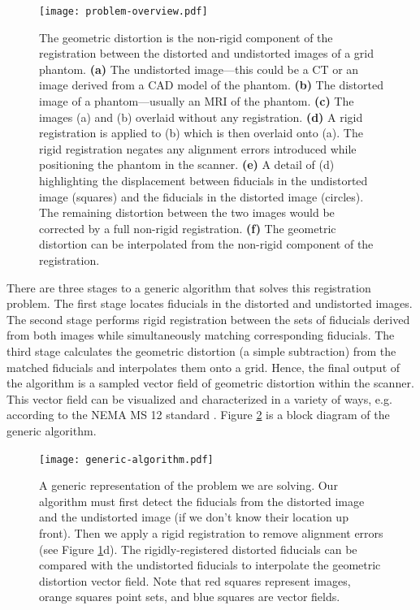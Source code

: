 \documentclass[12pt]{article}
\begin{document}
\begin{figure}
    \centering
    \texttt{[image: problem-overview.pdf]}
    \caption{The geometric distortion is the non-rigid component of the registration between the distorted and undistorted images of a grid phantom. \textbf{(a)} The undistorted image---this could be a CT or an image derived from a CAD model of the phantom.  \textbf{(b)} The distorted image of a phantom---usually an MRI of the phantom.  \textbf{(c)} The images (a) and (b) overlaid without any registration.  \textbf{(d)} A rigid registration is applied to (b) which is then overlaid onto (a).  The rigid registration negates any alignment errors introduced while positioning the phantom in the scanner. \textbf{(e)} A detail of (d) highlighting the displacement between fiducials in the undistorted image (squares) and the fiducials in the distorted image (circles).  The remaining distortion between the two images would be corrected by a full non-rigid registration. \textbf{(f)} The geometric distortion can be interpolated from the non-rigid component of the registration.}
    \label{fig:problem-overview}
\end{figure}

There are three stages to a generic algorithm that solves this registration problem.  The first stage locates fiducials in the distorted and undistorted images.  The second stage performs rigid registration between the sets of fiducials derived from both images while simultaneously matching corresponding fiducials.  The third stage calculates the geometric distortion (a simple subtraction) from the matched fiducials and interpolates them onto a grid.  Hence, the final output of the algorithm is a sampled vector field of geometric distortion within the scanner.  This vector field can be visualized and characterized in a variety of ways, e.g. according to the NEMA MS 12 standard \cite{nema2010}.  Figure \ref{fig:generic-algorithm} is a block diagram of the generic algorithm.

\begin{figure}
    \centering
    \texttt{[image: generic-algorithm.pdf]}
    \caption{A generic representation of the problem we are solving.  Our algorithm must first detect the fiducials from the distorted image and the undistorted image (if we don't know their location up front). Then we apply a rigid registration to remove alignment errors (see Figure \ref{fig:problem-overview}d). The rigidly-registered distorted fiducials can be compared with the undistorted fiducials to interpolate the geometric distortion vector field.  Note that red squares represent images, orange squares point sets, and blue squares are vector fields.}
    \label{fig:generic-algorithm}
\end{figure}
\end{document}
